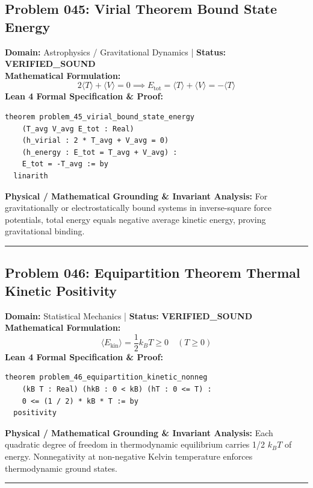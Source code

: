 \documentclass[10pt,a4paper]{article}
\begin{document}
\subsection*{Problem 045: Virial Theorem Bound State Energy}
\textbf{Domain:} Astrophysics / Gravitational Dynamics \quad | \quad \textbf{Status:} \textcolor{green!70!black}{\textbf{VERIFIED\_SOUND}}\\
\textbf{Mathematical Formulation:}
\begin{equation*}
  2\langle T \rangle + \langle V \rangle = 0 \implies E_{\text{tot}} = \langle T \rangle + \langle V \rangle = -\langle T \rangle
\end{equation*}
\textbf{Lean 4 Formal Specification \& Proof:}
\begin{lstlisting}
theorem problem_45_virial_bound_state_energy
    (T_avg V_avg E_tot : Real)
    (h_virial : 2 * T_avg + V_avg = 0)
    (h_energy : E_tot = T_avg + V_avg) :
    E_tot = -T_avg := by
  linarith
\end{lstlisting}
\textbf{Physical / Mathematical Grounding \& Invariant Analysis:}
For gravitationally or electrostatically bound systems in inverse-square force potentials, total energy equals negative average kinetic energy, proving gravitational binding.
\vspace{0.8em}\hrule\vspace{0.8em}
\subsection*{Problem 046: Equipartition Theorem Thermal Kinetic Positivity}
\textbf{Domain:} Statistical Mechanics \quad | \quad \textbf{Status:} \textcolor{green!70!black}{\textbf{VERIFIED\_SOUND}}\\
\textbf{Mathematical Formulation:}
\begin{equation*}
  \langle E_{\text{kin}} \rangle = \frac{1}{2} k_B T \ge 0 \quad (T \ge 0)
\end{equation*}
\textbf{Lean 4 Formal Specification \& Proof:}
\begin{lstlisting}
theorem problem_46_equipartition_kinetic_nonneg
    (kB T : Real) (hkB : 0 < kB) (hT : 0 <= T) :
    0 <= (1 / 2) * kB * T := by
  positivity
\end{lstlisting}
\textbf{Physical / Mathematical Grounding \& Invariant Analysis:}
Each quadratic degree of freedom in thermodynamic equilibrium carries 1/2 $k_B T$ of energy. Nonnegativity at non-negative Kelvin temperature enforces thermodynamic ground states.
\vspace{0.8em}\hrule\vspace{0.8em}
\end{document}
